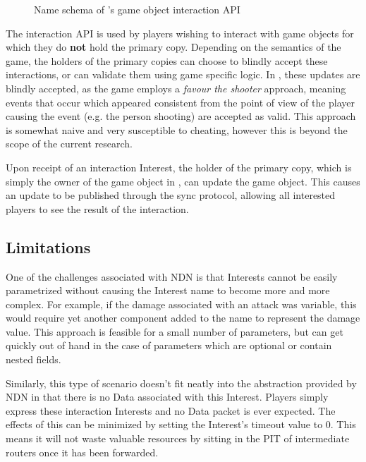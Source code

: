 \begin{figure}[H]
    \centering
    \caption{Name schema of \game{}'s game object interaction API}
    \label{fig:des:interaction-api-name}
\end{figure}

The interaction API is used by players wishing to interact with game objects for which they do \textbf{not} hold the primary copy. Depending on the semantics of the game, the holders of the primary copies can choose to blindly accept these interactions, or can validate them using game specific logic. In \game{}, these updates are blindly accepted, as the game employs a \textit{favour the shooter} approach, meaning events that occur which appeared consistent from the point of view of the player causing the event (e.g. the person shooting) are accepted as valid. This approach is somewhat naive and very susceptible to cheating, however this is beyond the scope of the current research. 

Upon receipt of an interaction Interest, the holder of the primary copy, which is simply the owner of the game object in \game{}, can update the game object. This causes an update to be published through the sync protocol, allowing all interested players to see the result of the interaction.


\subsection{Limitations}\label{sec:des:interaction:limitations}
One of the challenges associated with NDN is that Interests cannot be easily parametrized without causing the Interest name to become more and more complex. For example, if the damage associated with an attack was variable, this would require yet another component added to the name to represent the damage value. This approach is feasible for a small number of parameters, but can get quickly out of hand in the case of parameters which are optional or contain nested fields. 

Similarly, this type of scenario doesn't fit neatly into the abstraction provided by NDN in that there is no Data associated with this Interest. Players simply express these interaction Interests and no Data packet is ever expected. The effects of this can be minimized by setting the Interest's timeout value to 0. This means it will not waste valuable resources by sitting in the PIT of intermediate routers once it has been forwarded.

